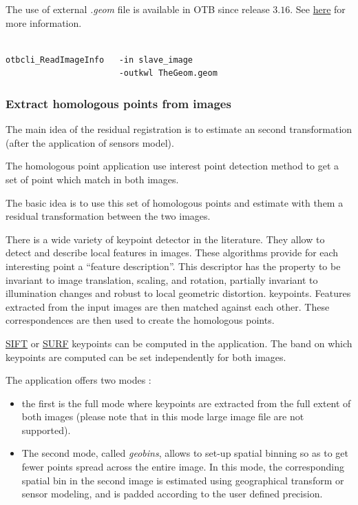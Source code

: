 The use of external \textit{.geom} file is available in OTB since release
$3.16$. See
\href{http://wiki.orfeo-toolbox.org/index.php/ExtendedFileName}{here} for more
information.

\begin{verbatim}

otbcli_ReadImageInfo   -in slave_image
                       -outkwl TheGeom.geom

\end{verbatim}


\subsubsection{Extract homologous points from images}

The main idea of the residual registration is to estimate an second
transformation (after the application of sensors model).

The homologous point application use interest point detection method to get a
set of point which match in both images.

The basic idea is to use this set of homologous points and estimate with them a
residual transformation between the two images.

There is a wide variety of keypoint detector in the literature. They allow to
detect and describe local features in images. These algorithms provide for each
interesting point a ``feature description''. This descriptor has the property to
be invariant to image translation, scaling, and rotation, partially invariant to
illumination changes and robust to local geometric distortion.  keypoints.
Features extracted from the input images are then matched against each
other. These correspondences are then used to create the homologous points.

\href{http://en.wikipedia.org/wiki/Scale-invariant_feature_transform}{SIFT} or
\href{http://en.wikipedia.org/wiki/SURF}{SURF} keypoints can be computed in the
application. The band on which keypoints are computed can be set independently
for both images.

The application offers two modes :
\begin{itemize}
\item the first is the full mode where keypoints
are extracted from the full extent of both images (please note that in this mode
large image file are not supported).
\item The second mode, called \textit{geobins},
allows to set-up spatial binning so as to get fewer points spread across the
entire image. In this mode, the corresponding spatial bin in the second image is
estimated using geographical transform or sensor modeling, and is padded
according to the user defined precision.
\end{itemize}

